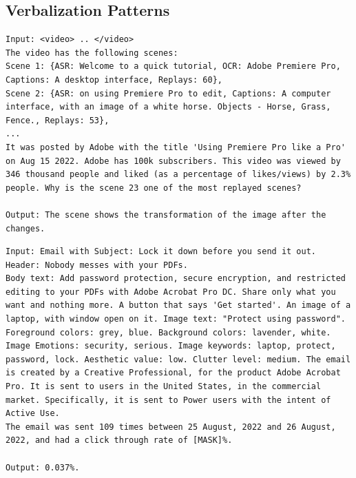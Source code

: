 \subsection{Verbalization Patterns}
\begin{lstlisting}[caption={Verbalization pattern of videos for the behavior understanding task:},frame=single,label={listing-behavior-understanding},basicstyle=\scriptsize]
Input: <video> .. </video>
The video has the following scenes:
Scene 1: {ASR: Welcome to a quick tutorial, OCR: Adobe Premiere Pro, Captions: A desktop interface, Replays: 60},
Scene 2: {ASR: on using Premiere Pro to edit, Captions: A computer interface, with an image of a white horse. Objects - Horse, Grass, Fence., Replays: 53},
...
It was posted by Adobe with the title 'Using Premiere Pro like a Pro' on Aug 15 2022. Adobe has 100k subscribers. This video was viewed by 346 thousand people and liked (as a percentage of likes/views) by 2.3% people. Why is the scene 23 one of the most replayed scenes?

Output: The scene shows the transformation of the image after the changes.
\end{lstlisting}


\begin{lstlisting}[caption={Verbalization pattern of emails for the behavior domain adapation task:},frame=single,label={listing-email-content-behavior-simulation},basicstyle=\scriptsize]
Input: Email with Subject: Lock it down before you send it out. 
Header: Nobody messes with your PDFs. 
Body text: Add password protection, secure encryption, and restricted editing to your PDFs with Adobe Acrobat Pro DC. Share only what you want and nothing more. A button that says 'Get started'. An image of a laptop, with window open on it. Image text: "Protect using password". 
Foreground colors: grey, blue. Background colors: lavender, white. Image Emotions: security, serious. Image keywords: laptop, protect, password, lock. Aesthetic value: low. Clutter level: medium. The email is created by a Creative Professional, for the product Adobe Acrobat Pro. It is sent to users in the United States, in the commercial market. Specifically, it is sent to Power users with the intent of Active Use.
The email was sent 109 times between 25 August, 2022 and 26 August, 2022, and had a click through rate of [MASK]%.

Output: 0.037%.
\end{lstlisting}



